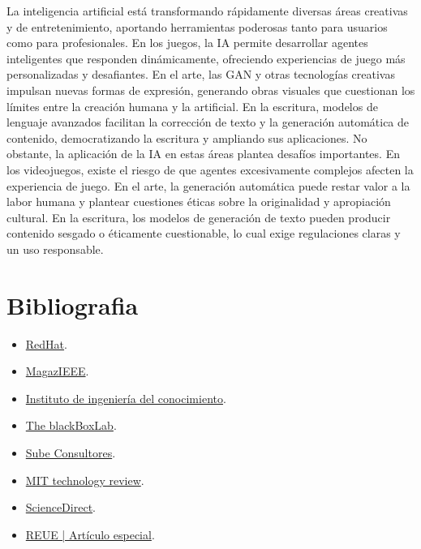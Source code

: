 \documentclass[12pt]{article}
\begin{document}
La inteligencia artificial está transformando rápidamente diversas áreas creativas y de entretenimiento, 
aportando herramientas poderosas tanto para usuarios como para profesionales. En los juegos, la IA permite desarrollar agentes 
inteligentes que responden dinámicamente, ofreciendo experiencias de juego más personalizadas y desafiantes. En el arte, las GAN y
otras tecnologías creativas impulsan nuevas formas de expresión, generando obras visuales que cuestionan los límites entre la creación humana
y la artificial. En la escritura, modelos de lenguaje avanzados facilitan la corrección de texto y la generación automática de contenido, 
democratizando la escritura y ampliando sus aplicaciones.
No obstante, la aplicación de la IA en estas áreas plantea desafíos importantes. En los videojuegos, existe el riesgo de que agentes 
excesivamente complejos afecten la experiencia de juego. En el arte, la generación automática puede restar valor a la labor humana y 
plantear cuestiones éticas sobre la originalidad y apropiación cultural. En la escritura, los modelos de generación de texto pueden 
producir contenido sesgado o éticamente cuestionable, lo cual exige regulaciones claras y un uso responsable.

\clearpage

\section{Bibliografia}
\begin{itemize}
    \item \href{https://www.redhat.com/es/topics/hyperconverged-infrastructure/what-is-software-defined-networking}{RedHat}.
    \item \href{https://r9.ieee.org/ecuador-magaz/rendimiento-y-modelamiento-de-sistemas-de-comunicacion-inalambrica-5g%E2%80%8B/}{MagazIEEE}.
    \item \href{https://www.iic.uam.es/innovacion/alphazero-y-el-go/}{Instituto de ingeniería del conocimiento}.
    \item \href{https://theblackboxlab.com/2024/02/23/deepmind/}{The blackBoxLab}.
    \item \href{https://www.linkedin.com/pulse/creatividad-artificial-est%C3%A1-la-ia-redefiniendo-el-concepto-e0djc/}{Sube Consultores}.
    \item \href{https://www.technologyreview.es/s/16532/que-es-la-inteligencia-artificial}{MIT technology review}.
    \item \href{https://www.sciencedirect.com/science/article/pii/S1136103423000114}{ScienceDirect}.
    \item \href{chrome-extension://efaidnbmnnnibpcajpcglclefindmkaj/https://www.reue.org/wp-content/uploads/2024/07/184-195.pdf}{REUE | Artículo especial}.


\end{itemize}
\end{document}
